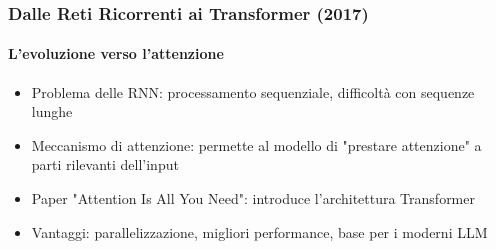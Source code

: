\begin{frame}[t,fragile]
{{\begin{minipage}[t]{\textwidth}
		\end{minipage}
		}
	}
\end{frame}
%
\begin{frame}[t,fragile] \frametitle{Dalle Reti Ricorrenti ai Transformer (2017)}
	{\scriptsize
		\onslide<1->
            \framesubtitle{L'evoluzione verso l'attenzione}
            \vspace*{-15pt}
	    	\begin{minipage}[t]{\textwidth}
				\begin{minipage}[t]{0.6\textwidth}
	    			\begin{itemize}[leftmargin=10pt,align=right]
						\onslide<2->\item[\alert{\faHandORight}] \alert{Problema delle RNN:} processamento sequenziale, difficoltà con sequenze lunghe
						\onslide<3->\item[\alert{\faHandORight}] \alert{Meccanismo di attenzione:} permette al modello di "prestare attenzione" a parti rilevanti dell'input
						\onslide<4->\item[\alert{\faHandORight}] \alert{Paper "Attention Is All You Need":} introduce l'architettura Transformer
						\onslide<5->\item[\alert{\faHandORight}] \alert{Vantaggi:} parallelizzazione, migliori performance, base per i moderni LLM
					\end{itemize}
            	\end{minipage}
	    	\end{minipage}
	}
\end{frame}
%
